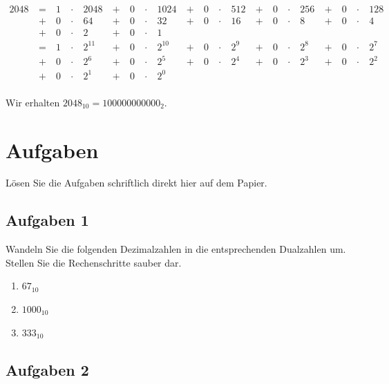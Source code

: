 \begin{example}

\begin{align*}
2048 & ~ = ~ & 1 & ~\cdot~ & 2048  & ~ + ~ & 0 & ~\cdot~ & 1024 & ~ + ~ & 0 & ~\cdot~ & 512 & ~ + ~ & 0 & ~\cdot~ & 256 & ~ + ~ & 0 & ~\cdot~ & 128 \\ 
& ~ + ~ & 0 & ~\cdot~ & 64 & ~ + ~ & 0 & ~\cdot~ & 32 & ~ + ~ & 0 & ~\cdot~ & 16 & ~ + ~ & 0 & ~\cdot~ & 8 & ~ + ~ & 0 & ~\cdot~ & 4 \\
& ~ + ~ & 0 & ~\cdot~ & 2 & ~ + ~ & 0 & ~\cdot~ & 1  \\
& ~ = ~ & 1 & ~\cdot~ & 2^{11}  & ~ + ~ & 0 & ~\cdot~ & 2^{10}  & ~ + ~ & 0 & ~\cdot~ & 2^9 & ~ + ~ & 0 & ~\cdot~ & 2^8 & ~ + ~ & 0 & ~\cdot~ & 2^7 \\ 
& ~ + ~ & 0 & ~\cdot~ & 2^6 & ~ + ~ & 0 & ~\cdot~ & 2^5 & ~ + ~ & 0 & ~\cdot~ & 2^4 & ~ + ~ & 0 & ~\cdot~ & 2^3 & ~ + ~ & 0 & ~\cdot~ & 2^2 \\ 
& ~ + ~ & 0 & ~\cdot~ & 2^1 & ~ + ~ & 0 & ~\cdot~ & 2^0  \\
\end{align*}

Wir erhalten $2048_{10} = 100000000000_2$.

\end{example}

\newpage

\section{Aufgaben}

Lösen Sie die Aufgaben schriftlich direkt hier auf dem Papier.

\subsection{Aufgaben 1}

Wandeln Sie die folgenden Dezimalzahlen in die entsprechenden Dualzahlen um. Stellen Sie die Rechenschritte sauber dar.

\begin{enumerate}
\item $67_{10}$
\fillwithgrid{2.5in}
\item $1000_{10}$
\fillwithgrid{2.5in}
\item $333_{10}$
\fillwithgrid{2.5in}
\end{enumerate}

\subsection{Aufgaben 2}

